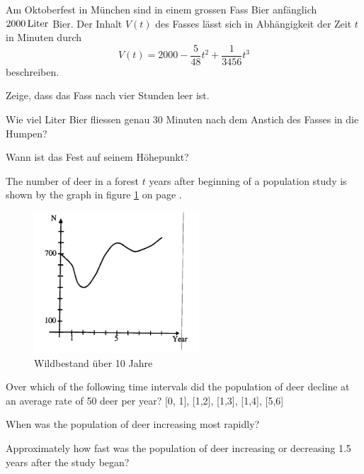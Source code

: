\documentclass[%
11pt,%
twoside,%
titlepage,%
german,%
headsepline%
]{scrartcl}
\begin{document}
\begin{ueb}
Am
Oktoberfest in M\"unchen sind in einem grossen Fass Bier anf\"anglich $\unit[2000]{Liter}$ Bier. Der Inhalt $V(t)$ des Fasses l\"asst sich in Abh\"angigkeit der Zeit $t$ in Minuten durch
$$V(t)=2000-\frac{5}{48}t^2+\frac{1}{3456}t^3$$
beschreiben.
\begin{enumeratea}
\item Zeige, dass das Fass nach vier Stunden leer ist.
\item Wie viel Liter Bier fliessen genau 30 Minuten nach dem Anstich des Fasses in die Humpen?
\item Wann ist das Fest auf seinem \glqq H\"ohepunkt\grqq?
\end{enumeratea}
\end{ueb}

\begin{ueb}[Wildsaison]
The
number of deer in a forest $t$ years after beginning of a population study is shown by the graph in figure \ref{deer} on page \pageref{deer}.

\begin{figure}
\begin{center}
\includegraphics[width=0.55\textwidth,angle=0.8]{pictures/deer}
\end{center}
\caption{Wildbestand \"uber 10 Jahre}\label{deer}
\end{figure}

\begin{enumeratea}
\item Over which of the following time intervals did the population of deer decline at an average rate of 50 deer per year? [0, 1], [1,2], [1,3], [1,4], [5,6]
\item When was the population of deer increasing most rapidly?
\item Approximately how fast was the population of deer increasing or decreasing 1.5 years after the study began?
\end{enumeratea}
\end{ueb}
\end{document}
